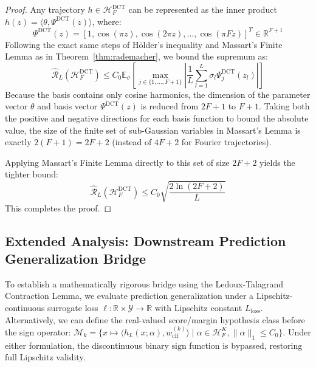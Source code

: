 \begin{proof}
Any trajectory $h \in \mathcal{H}_F^{\text{DCT}}$ can be represented as the inner product $h(z) = \langle \theta, \Psi^{\text{DCT}}(z) \rangle$, where:
\begin{equation}
    \Psi^{\text{DCT}}(z) = [1, \cos(\pi z), \cos(2\pi z), \dots, \cos(\pi F z)]^T \in \mathbb{R}^{F+1}
\end{equation}
Following the exact same steps of H{\"o}lder's inequality and Massart's Finite Lemma as in Theorem~\ref{thm:rademacher}, we bound the supremum as:
\begin{equation}
    \widehat{\mathcal{R}}_L(\mathcal{H}_F^{\text{DCT}}) \le C_0 \mathbb{E}_{\sigma} \left[ \max_{j \in \{1, \dots, F+1\}} \left| \frac{1}{L} \sum_{l=1}^L \sigma_l \Psi^{\text{DCT}}_j(z_l) \right| \right]
\end{equation}
Because the basis contains only cosine harmonics, the dimension of the parameter vector $\theta$ and basis vector $\Psi^{\text{DCT}}(z)$ is reduced from $2F+1$ to $F+1$. Taking both the positive and negative directions for each basis function to bound the absolute value, the size of the finite set of sub-Gaussian variables in Massart's Lemma is exactly $2(F+1) = 2F+2$ (instead of $4F+2$ for Fourier trajectories).

Applying Massart's Finite Lemma directly to this set of size $2F+2$ yields the tighter bound:
\begin{equation}
    \widehat{\mathcal{R}}_L(\mathcal{H}_F^{\text{DCT}}) \le C_0 \sqrt{\frac{2 \ln(2F+2)}{L}}
\end{equation}
This completes the proof.
\end{proof}


\subsection{Extended Analysis: Downstream Prediction Generalization Bridge}
\label{sec:appendix_generalization_bridge}
To establish a mathematically rigorous bridge using the Ledoux-Talagrand Contraction Lemma, we evaluate prediction generalization under a Lipschitz-continuous surrogate loss $\ell: \mathbb{R} \times \mathcal{Y} \to \mathbb{R}$ with Lipschitz constant $L_{\text{loss}}$. Alternatively, we can define the real-valued score/margin hypothesis class before the sign operator: $\mathcal{M}_k = \{ x \mapsto \langle h_L(x; \alpha), w_{\text{clf}}^{(k)} \rangle \mid \alpha \in \mathcal{H}_F^K, \|\alpha\|_1 \le C_0 \}$. Under either formulation, the discontinuous binary $\text{sign}$ function is bypassed, restoring full Lipschitz validity.

